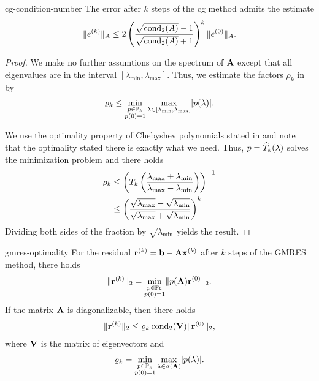 \begin{Corollary}{cg-condition-number}
  The error after $k$ steps of the cg method admits the estimate
  \begin{gather}
    \lVert e^{(k)}\rVert_A \le 2 \left(
      \frac{\sqrt{\operatorname{cond}_2(A)}-1}{\sqrt{\operatorname{cond}_2(A)}+1}\right)^k
    \lVert e^{(0)}\rVert_A.
  \end{gather}
\end{Corollary}

\begin{proof}
  We make no further assumtions on the spectrum of $\mathbf A$ except that
  all eigenvalues are in the interval
  $[\lambda_{\min},\lambda_{\max}]$. Thus, we estimate the factors $\rho_k$ in  by
  \begin{gather}
    \varrho_k \le \min_{\substack{p\in\mathbb P_k\\p(0) = 1}}
    \max_{\lambda\in[\lambda_{\min},\lambda_{\max}]} \lvert p(\lambda)\rvert.
  \end{gather}
  
  We use the optimality property of Chebyshev polynomials stated in
   and note that the
  optimality stated there is exactly what we need. Thus,
  $p = \widehat{T}_k(\lambda)$ solves the minimization
  problem and there holds
  \begin{align}
    \varrho_k
    &\le \left(T_k\left(
      \frac{\lambda_{\max}+\lambda_{\min}}{\lambda_{\max}-\lambda_{\min}}
      \right)\right)^{-1}\\
    & \le \left(\frac{\sqrt{\lambda_{\max}}-\sqrt{\lambda_{\min}}}{\sqrt{\lambda_{\max}}+\sqrt{\lambda_{\min}}}
      \right)^k
  \end{align}
  Dividing both sides of the fraction by $\sqrt{\lambda_{\min}}$ yields the result.
\end{proof}

\begin{Theorem}{gmres-optimality}
  For the residual $\mathbf r^{(k)} = \mathbf b-\mathbf A\mathbf x^{(k)}$ after $k$ steps of
  the GMRES method, there holds
  \begin{gather}
    \lVert\mathbf r^{(k)}\rVert_2 = \min_{\substack{p\in\mathbb P_k\\p(0) = 1}}
    \lVert p(\mathbf A)\mathbf r^{(0)}\rVert_2.
  \end{gather}
  If the matrix $\mathbf A$ is diagonalizable, then there holds
    \begin{gather}
    \lVert\mathbf r^{(k)}\rVert_2 \le \varrho_k \operatorname{cond}_2(\mathbf V) \lVert\mathbf r^{(0)}\rVert_2,
  \end{gather}
  where $\mathbf V$ is the matrix of eigenvectors and
  \begin{gather}
    \varrho_k = \min_{\substack{p\in\mathbb P_k\\p(0) = 1}} \max_{\lambda\in\sigma(\mathbf A)} \lvert p(\lambda)\rvert.
  \end{gather}
\end{Theorem}

